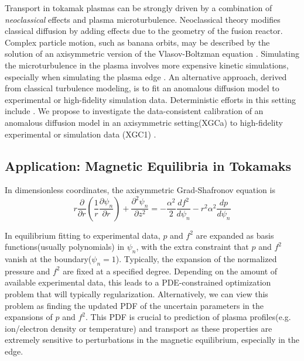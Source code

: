 \documentclass{amsart}
\begin{document}
Transport in tokamak plasmas can be strongly driven by a combination of {\em neoclassical} effects
and plasma microturbulence.  Neoclassical theory modifies classical diffusion by adding  effects due to the geometry of the fusion reactor.  Complex particle motion, such as banana orbits, may be described by the solution of an axisymmetric version of the Vlasov-Boltzman equation \cite{Wesson}.
Simulating the microturbulence in the plasma involves more expensive kinetic simulations, especially when simulating the plasma edge \cite{KU_TOTALF}.  An alternative approach, derived from classical turbulence modeling, is to fit an anomalous diffusion model to  experimental or high-fidelity simulation data.  Deterministic efforts in this setting include \cite{battaglia}.  We propose to 
investigate the data-consistent calibration of an anomalous diffusion model in an axisymmetric setting(XGCa) to high-fidelity experimental or simulation data (XGC1) \cite{KU_TOTALF}.



\subsection{Application: Magnetic Equilibria in Tokamaks}

In dimensionless coordinates, the axisymmetric  Grad-Shafronov equation is \cite{Takeda91}
\begin{equation}
r\frac{\partial}{\partial r} \left( \frac{1}{r} \frac{\partial\psi_n}{\partial r} \right) + \frac{\partial^2 \psi_n}{\partial z^2} = -\frac{\alpha^2}{2} \frac{d f^2}{d \psi_n} - r^2\alpha^2 \frac{dp}{d\psi_n}
\end{equation}

In equilibrium fitting to experimental data\cite{Lao85}, $p$ and $f^2$ are expanded as basis functions(usually polynomials) in $\psi_n$, with the extra constraint that $p$ and $f^2$ vanish at the boundary($\psi_n=1$).   Typically, the expansion of the normalized pressure and $f^2$ are fixed
at a specified degree.    Depending on the amount of available experimental data, this leads to a PDE-constrained optimization problem that will typically regularization.  Alternatively, we can view this problem as finding the updated PDF of the uncertain parameters in the expansions of $p$ and $f^2$.  This PDF is
crucial to prediction of plasma profiles(e.g. ion/electron density or temperature) and transport as these properties are extremely sensitive to perturbations
in the magnetic equilibrium, especially in the edge.
\end{document}

